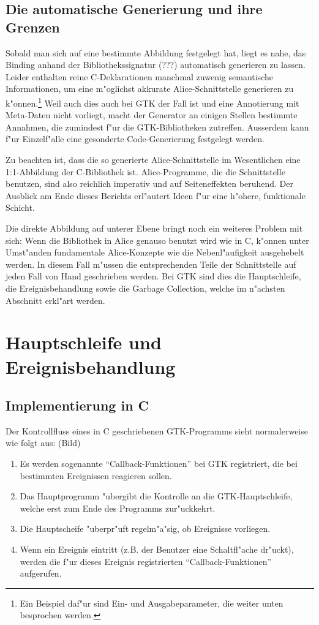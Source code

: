\documentclass{article}
\begin{document}
\subsection*{Die automatische Generierung und ihre Grenzen}

Sobald man sich auf eine bestimmte Abbildung festgelegt hat, liegt es nahe,
das Binding anhand der Bibliothekssignatur (???) automatisch generieren zu
lassen. Leider enthalten reine C-Deklarationen manchmal zuwenig semantische
Informationen, um eine m"oglichst akkurate Alice-Schnittstelle generieren
zu k"onnen.\footnote{Ein Beispiel daf"ur sind Ein- und Ausgabeparameter, die
weiter unten besprochen werden.} Weil auch dies auch bei GTK der Fall
ist und eine Annotierung mit Meta-Daten nicht vorliegt, macht der Generator
an einigen Stellen bestimmte Annahmen, die zumindest f"ur die GTK-Bibliotheken
zutreffen. Ausserdem kann f"ur Einzelf"alle eine gesonderte Code-Generierung
festgelegt werden.

Zu beachten ist, dass die so generierte Alice-Schnittstelle im Wesentlichen
eine 1:1-Abbildung der C-Bibliothek ist. Alice-Programme, die die Schnittstelle
benutzen, sind also reichlich imperativ und auf Seiteneffekten beruhend.
Der Ausblick am Ende dieses Berichts erl"autert Ideen f"ur eine h"ohere,
funktionale Schicht.

Die direkte Abbildung auf unterer Ebene bringt noch ein weiteres Problem
mit sich: Wenn die Bibliothek in Alice genauso benutzt wird wie in C, 
k"onnen unter Umst"anden fundamentale Alice-Konzepte wie die Nebenl"aufigkeit
ausgehebelt werden. In diesem Fall m"ussen die entsprechenden Teile der
Schnittstelle auf jeden Fall von Hand geschrieben werden.
Bei GTK sind dies die Hauptschleife, die Ereignisbehandlung sowie die
Garbage Collection, welche im n"achsten Abschnitt erkl"art werden.

\section{Hauptschleife und Ereignisbehandlung}

\subsection{Implementierung in C}

Der Kontrollfluss eines in C geschriebenen GTK-Programms sieht normalerweise
wie folgt aus: (Bild)

\begin{enumerate}
\item Es werden sogenannte ``Callback-Funktionen'' bei GTK registriert, die
      bei bestimmten Ereignissen reagieren sollen.
\item Das Hauptprogramm "ubergibt die Kontrolle an die GTK-Hauptschleife,
      welche erst zum Ende des Programms zur"uckkehrt.
\item Die Hauptscheife "uberpr"uft regelm"a"sig, ob Ereignisse vorliegen.
\item Wenn ein Ereignis eintritt (z.B. der Benutzer eine Schaltfl"ache 
      dr"uckt), werden die f"ur dieses Ereignis registrierten
      ``Callback-Funktionen'' aufgerufen.
\end{enumerate}
\end{document}
